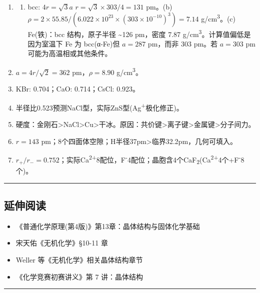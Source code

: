 \begin{enumerate}
\begin{enumerate}
  \end{enumerate}
\item
  \begin{enumerate}
  \def\labelenumii{(\alph{enumii})}
  \tightlist
  \item
    bcc: \(4r = \sqrt{3}a\) \箭 \(r = \sqrt{3}\times303/4 = 131\) pm。(b) \(\rho = 2\times55.85/(6.022\times10^{23}\times(303\times10^{-10})^3) = 7.14\) g/cm\textsuperscript{3}。(c) Fe(铁)：bcc 结构，原子半径 \textasciitilde126 pm，密度 7.87 g/cm\textsuperscript{3}。计算值偏低是因为室温下 Fe 为 bcc(α-Fe)但 \(a=287\) pm，而非 303 pm。若 \(a=303\) pm 可能为高温相或其他条件。
  \end{enumerate}
\item
  \(a=4r/\sqrt{2}=362\) pm，\(\rho=8.90\) g/cm\textsuperscript{3}。
\item
  KBr: 0.704；CaO: 0.714；CsCl: 0.923。
\item
  半径比0.523预测NaCl型，实际ZnS型(Ag\textsuperscript{+}极化修正)。
\item
  硬度：金刚石\textgreater NaCl\textgreater Cu\textgreater 干冰。原因：共价键\textgreater 离子键\textgreater 金属键\textgreater 分子间力。
\item
  \(r=143\) pm；8个四面体空隙；H半径37pm\textgreater 临界32.2pm，几何可填入。
\item
  \(r_+/r_-=0.752\)；实际Ca\textsuperscript{2+}8配位，F\textsuperscript{-}4配位；晶胞含4个CaF\textsubscript{2}(Ca\textsuperscript{2+}4个+F\textsuperscript{-}8个)。
\end{enumerate}

\begin{center}\rule{0.5\linewidth}{0.5pt}\end{center}

\subsection{延伸阅读}\label{ux5ef6ux4f38ux9605ux8bfb}

\begin{itemize}
\tightlist
\item
  《普通化学原理(第4版)》第13章：晶体结构与固体化学基础
\item
  宋天佑《无机化学》§10-11 章
\item
  Weller 等《无机化学》相关晶体结构章节
\item
  《化学竞赛初赛讲义》第 7 讲：晶体结构
\end{itemize}

\begin{center}\rule{0.5\linewidth}{0.5pt}\end{center}
